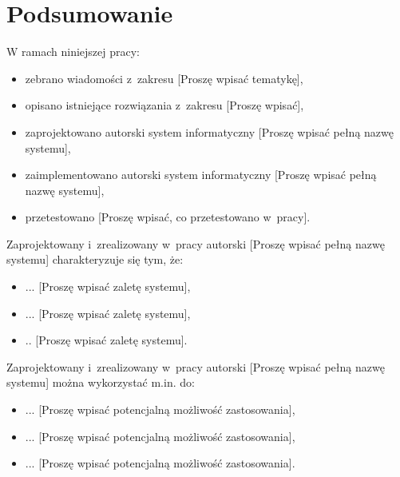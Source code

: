 \cleardoublepage
\chapter{Podsumowanie}


W ramach niniejszej pracy:

\begin{itemize}
\item zebrano wiadomości z~zakresu [Proszę wpisać tematykę],
\item opisano istniejące rozwiązania z~zakresu [Proszę wpisać],
\item zaprojektowano autorski system informatyczny [Proszę wpisać pełną nazwę systemu],
\item zaimplementowano autorski system informatyczny [Proszę wpisać pełną nazwę systemu],
\item przetestowano [Proszę wpisać, co przetestowano w~pracy].
\end{itemize}

Zaprojektowany i~zrealizowany w~pracy autorski [Proszę wpisać pełną nazwę systemu] charakteryzuje się tym, że:

\begin{itemize}
\item ... [Proszę wpisać zaletę systemu],
\item ... [Proszę wpisać zaletę systemu],
\item .. [Proszę wpisać zaletę systemu].
\end{itemize}

Zaprojektowany i~zrealizowany w~pracy autorski [Proszę wpisać pełną nazwę systemu] można wykorzystać m.in. do:

\begin{itemize}
\item ... [Proszę wpisać potencjalną możliwość zastosowania],
\item ... [Proszę wpisać potencjalną możliwość zastosowania],
\item ... [Proszę wpisać potencjalną możliwość zastosowania].
\end{itemize}


